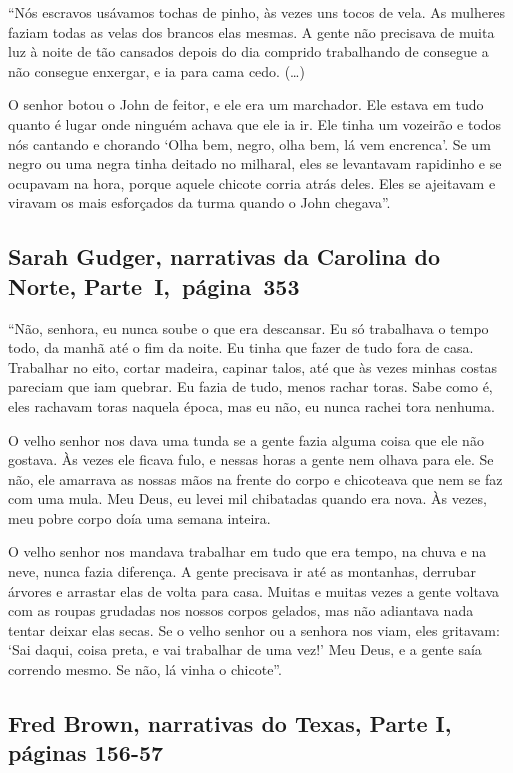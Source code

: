``Nós escravos usávamos tochas de pinho, às vezes uns tocos de vela. As
mulheres faziam todas as velas dos brancos elas mesmas. A gente não
precisava de muita luz à noite de tão cansados depois do dia comprido
trabalhando de consegue a não consegue enxergar, e ia para cama cedo.
(\ldots{})

O senhor botou o John de feitor, e ele era um marchador. Ele estava em
tudo quanto é lugar onde ninguém achava que ele ia ir. Ele tinha um
vozeirão e todos nós cantando e chorando `Olha bem, negro, olha bem, lá
vem encrenca'. Se um negro ou uma negra tinha deitado no milharal, eles
se levantavam rapidinho e se ocupavam na hora, porque aquele chicote
corria atrás deles. Eles se ajeitavam e viravam os mais esforçados da
turma quando o John chegava''.

\subsection{Sarah Gudger, narrativas da Carolina do Norte, Parte~I,~página~353}
\label{ref114}

``Não, senhora, eu nunca soube o que era descansar. Eu só trabalhava o
tempo todo, da manhã até o fim da noite. Eu tinha que fazer de tudo fora
de casa. Trabalhar no eito, cortar madeira, capinar talos, até que às
vezes minhas costas pareciam que iam quebrar. Eu fazia de tudo, menos
rachar toras. Sabe como é, eles rachavam toras naquela época, mas eu
não, eu nunca rachei tora nenhuma.

O velho senhor nos dava uma tunda se a gente fazia alguma coisa que ele
não gostava. Às vezes ele ficava fulo, e nessas horas a gente nem olhava
para ele. Se não, ele amarrava as nossas mãos na frente do corpo e
chicoteava que nem se faz com uma mula. Meu Deus, eu levei mil
chibatadas quando era nova. Às vezes, meu pobre corpo doía uma semana
inteira.

O velho senhor nos mandava trabalhar em tudo que era tempo, na chuva e
na neve, nunca fazia diferença. A gente precisava ir até as montanhas,
derrubar árvores e arrastar elas de volta para casa. Muitas e muitas
vezes a gente voltava com as roupas grudadas nos nossos corpos gelados,
mas não adiantava nada tentar deixar elas secas. Se o velho senhor ou a
senhora nos viam, eles gritavam: `Sai daqui, coisa preta, e vai
trabalhar de uma vez!' Meu Deus, e a gente saía correndo mesmo. Se não,
lá vinha o chicote''.

\subsection{Fred Brown, narrativas do Texas, Parte I, páginas 156-57} \label{ref35}

